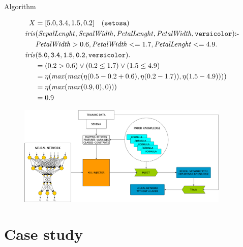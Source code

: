 \documentclass[presentation]{beamer}\mode<presentation>{\usetheme{AMSBolognaFC}}
\begin{document}
\begin{frame}[allowframebreaks]{Algorithm}
{        \begin{equation*}
            \centering
            \begin{aligned}
                X &= [5.0, 3.4, 1.5, 0.2]\quad (\const{setosa})\\
                \pred{iris}&(\var{SepalLenght}, \var{SepalWidth}, \var{PetalLenght}, \var{PetalWidth}, \const{versicolor}) \text{:-}\\
                &\var{PetalWidth} > 0.6, \var{PetalWidth} <= 1.7, \var{PetalLenght} <= 4.9.\\
                \pred{iris}&(\const{5.0}, \const{3.4}, \const{1.5}, \const{0.2}, \const{versicolor}).\\
                &= (0.2 > 0.6) \vee (0.2 \le 1.7) \vee (1.5 \le 4.9)\\
                &= \eta(\pred{max}(\pred{max}(\eta(0.5 - 0.2 + 0.6), \eta(0.2 - 1.7)), \eta(1.5 - 4.9))))\\
                &= \eta(\pred{max}(\pred{max}(0.9, 0), 0)))\\
                &= 0.9
            \end{aligned}
        \end{equation*}
    
        \framebreak
    }
    
    \begin{figure}
        \centering
        \includegraphics[width=0.9\textwidth]{figures/kill.png}
    \end{figure}
    
\end{frame}

\section{Case study}
\end{document}
